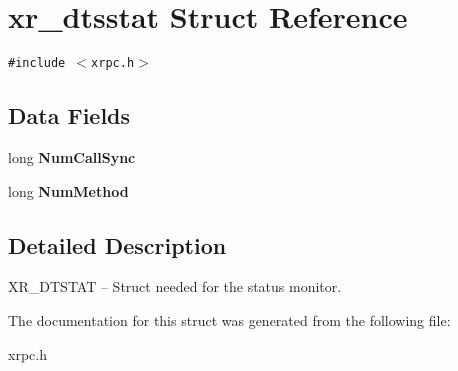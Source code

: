 \hypertarget{structxr__dtsstat}{
\section{xr\_\-dtsstat Struct Reference}
\label{structxr__dtsstat}
}
{\tt \#include $<$xrpc.h$>$}

\subsection*{Data Fields}
\begin{CompactItemize}
\item 
\hypertarget{structxr__dtsstat_4d0d79da0344bb61db998e1878a8120d}{
long \textbf{NumCallSync}}
\label{structxr__dtsstat_4d0d79da0344bb61db998e1878a8120d}

\item 
\hypertarget{structxr__dtsstat_9bca254e4cd73ef0f7820741aeed73b4}{
long \textbf{NumMethod}}
\label{structxr__dtsstat_9bca254e4cd73ef0f7820741aeed73b4}

\end{CompactItemize}


\subsection{Detailed Description}
XR\_\-DTSTAT -- Struct needed for the status monitor. 

The documentation for this struct was generated from the following file:\begin{CompactItemize}
\item 
xrpc.h\end{CompactItemize}
